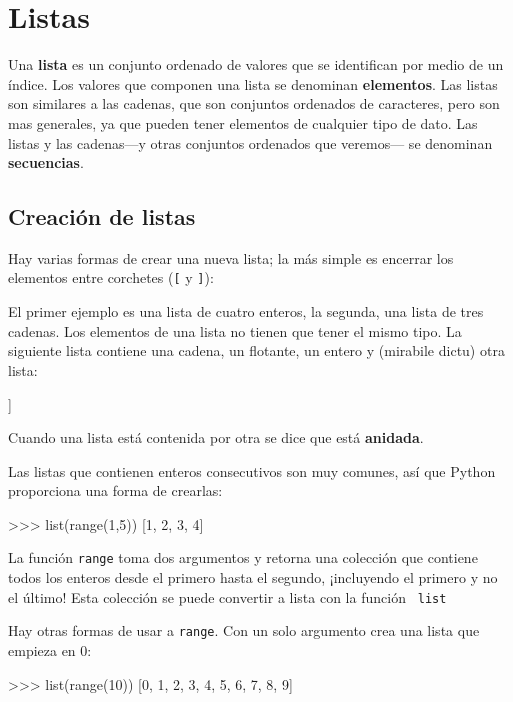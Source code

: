 
\chapter{Listas}

\label{cap:listas}   

Una \textbf{lista} es un conjunto ordenado de valores que se identifican
por medio de un índice. Los valores que componen una lista se denominan
\textbf{elementos}. Las listas son similares a las cadenas, que son
conjuntos ordenados de caracteres, pero son mas generales, ya que
pueden tener elementos de cualquier tipo de dato. Las listas y las
cadenas—y otras conjuntos ordenados que veremos— se denominan \textbf{secuencias}.

\section{Creación de listas}

Hay varias formas de crear una nueva lista; la más simple es encerrar
los elementos entre corchetes (\verb+[+ y \verb+]+):
\begin{pythoncode}
\end{pythoncode}

El primer ejemplo es una lista de cuatro enteros, la segunda, una
lista de tres cadenas. Los elementos de una lista no tienen que tener
el mismo tipo. La siguiente lista contiene una cadena, un flotante,
un entero y (mirabile dictu) otra lista:
\begin{pythoncode}
["hola", 2.0, 5, [10, 20]]
\end{pythoncode}

Cuando una lista está contenida por otra se dice que está \textbf{anidada}.


Las listas que contienen enteros consecutivos son muy comunes, así
que Python proporciona una forma de crearlas:
\begin{pyconcode}
>>> list(range(1,5))
[1, 2, 3, 4]
\end{pyconcode}

La función \texttt{range} toma dos argumentos y retorna una colección
que contiene todos los enteros desde el primero hasta el segundo,
¡incluyendo el primero y no el último! Esta colección se puede convertir
a lista con la función  \texttt{ list }

Hay otras formas de usar a \texttt{range}. Con un solo argumento crea
una lista que empieza en 0:
\begin{pyconcode}
>>> list(range(10))
[0, 1, 2, 3, 4, 5, 6, 7, 8, 9]
\end{pyconcode}

